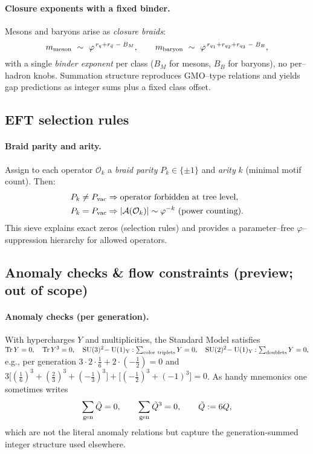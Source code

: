 \documentclass[epjc3]{svjour3}
\begin{document}
\paragraph{Closure exponents with a fixed binder.}
Mesons and baryons arise as \emph{closure braids}:
\begin{equation}
  m_{\rm meson}\ \sim\ \varphi^{\,r_q+r_{\bar q}\;-\;B_M},
  \qquad
  m_{\rm baryon}\ \sim\ \varphi^{\,r_{q_1}+r_{q_2}+r_{q_3}\;-\;B_B},
  \label{eq:hadron-binders}
\end{equation}
with a single \emph{binder exponent} per class ($B_M$ for mesons, $B_B$ for baryons), no per--hadron knobs. Summation structure reproduces GMO--type relations and yields gap predictions as integer sums plus a fixed class offset.

\subsection{EFT selection rules}
\paragraph{Braid parity and arity.}
Assign to each operator $\mathcal O_k$ a \emph{braid parity} $P_k\in\{\pm 1\}$ and \emph{arity} $k$ (minimal motif count). Then:
\begin{equation}
\begin{split}
  P_k \neq P_{\rm vac} &\Rightarrow \text{operator forbidden at tree level}, \\
  P_k=P_{\rm vac} &\Rightarrow |\mathcal A(\mathcal O_k)| \sim \varphi^{-k}\ \text{(power counting)}.
\end{split}
\label{eq:eft-sieve}
\end{equation}
This sieve explains exact zeros (selection rules) and provides a parameter--free $\varphi$--suppression hierarchy for allowed operators.

\subsection{Anomaly checks \& flow constraints (preview; out of scope)}
\paragraph{Anomaly checks (per generation).}
With hypercharges $Y$ and multiplicities, the Standard Model satisfies
\(
\mathrm{Tr}\,Y = 0,\quad
\mathrm{Tr}\,Y^3 = 0,\quad
\mathrm{SU(3)^2\!-U(1)_Y}: \sum_{\rm color~triplets} Y = 0,\quad
\mathrm{SU(2)^2\!-U(1)_Y}: \sum_{\rm doublets} Y = 0,
\)
e.g., per generation
\(
3\cdot 2\cdot \tfrac{1}{6} + 2\cdot (-\tfrac12)=0
\)
and
\(
3\big[(\tfrac16)^3+(\tfrac{2}{3})^3+(-\tfrac13)^3\big] + \big[(-\tfrac12)^3 + (-1)^3\big] = 0
\).
As handy mnemonics one sometimes writes
\begin{equation}
  \sum_{\rm gen} \tilde Q = 0,\qquad \sum_{\rm gen} \tilde Q^3 = 0,\qquad \tilde Q:=6Q,\label{eq:anomaly-integers}
\end{equation}
which are not the literal anomaly relations but capture the generation-summed integer structure used elsewhere.
\end{document}
